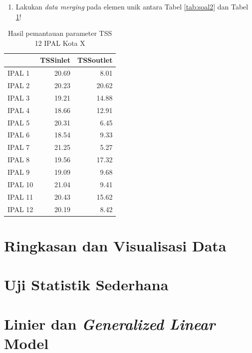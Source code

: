 \documentclass[12pt,]{krantz}
\providecommand{\tightlist}{%
  \setlength{\itemsep}{0pt}\setlength{\parskip}{0pt}}
\begin{document}
\begin{enumerate}
\def\labelenumi{\arabic{enumi}.}
\setcounter{enumi}{2}
\tightlist
\item
  Lakukan \emph{data merging} pada elemen unik antara Tabel \ref{tab:soal2} dan Tabel \ref{tab:soal3}!
\end{enumerate}

\begin{table}

\caption{\label{tab:soal3}Hasil pemantauan parameter TSS 12 IPAL Kota X}
\centering
\begin{tabular}[t]{l|r|r}
\hline
  & TSSinlet & TSSoutlet\\
\hline
IPAL 1 & 20.69 & 8.01\\
\hline
IPAL 2 & 20.23 & 20.62\\
\hline
IPAL 3 & 19.21 & 14.88\\
\hline
IPAL 4 & 18.66 & 12.91\\
\hline
IPAL 5 & 20.31 & 6.45\\
\hline
IPAL 6 & 18.54 & 9.33\\
\hline
IPAL 7 & 21.25 & 5.27\\
\hline
IPAL 8 & 19.56 & 17.32\\
\hline
IPAL 9 & 19.09 & 9.68\\
\hline
IPAL 10 & 21.04 & 9.41\\
\hline
IPAL 11 & 20.43 & 15.62\\
\hline
IPAL 12 & 20.19 & 8.42\\
\hline
\end{tabular}
\end{table}

\hypertarget{ringkasan-dan-visualisasi-data}{%
\chapter{Ringkasan dan Visualisasi Data}\label{ringkasan-dan-visualisasi-data}}

\hypertarget{uji-statistik-sederhana}{%
\chapter{Uji Statistik Sederhana}\label{uji-statistik-sederhana}}

\hypertarget{linier-dan-generalized-linear-model}{%
\chapter{\texorpdfstring{Linier dan \emph{Generalized Linear} Model}{Linier dan Generalized Linear Model}}\label{linier-dan-generalized-linear-model}}
\end{document}
